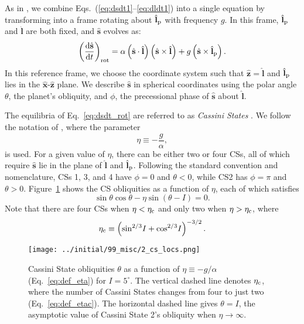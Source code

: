 \documentclass[
        fleqn,
        usenatbib,
    ]{mnras}
\newcommand*{\rd}[2]{\frac{\mathrm{d}#1}{\mathrm{d}#2}}
\newcommand*{\p}[1]{\left(#1\right)}
\newcommand*{\uv}[1]{\hat{\mathbf{#1}}}
\begin{document}
As in \citet{su2020}, we combine Eqs.~(\ref{eq:dsdt1}--\ref{eq:dldt1}) into a
single equation by transforming into a frame rotating about $\uv{l}_{\rm p}$
with frequency $g$. In this frame, $\uv{l}_{\rm p}$ and $\uv{l}$ are both fixed,
and $\uv{s}$ evolves as:
\begin{equation}
    \p{\rd{\uv{s}}{t}}_{\rm rot}
        = \alpha\p{\uv{s} \cdot \uv{l}}\p{\uv{s} \times \uv{l}}
            + g\p{\uv{s} \times \uv{l}_{\rm p}}. \label{eq:dsdt_rot}
\end{equation}
In this reference frame, we choose the coordinate system such that $\uv{z} =
\uv{l}$ and $\uv{l}_{\rm p}$ lies in the $\uv{x}$-$\uv{z}$ plane. We describe
$\uv{s}$ in spherical coordinates using the polar angle $\theta$, the planet's
obliquity, and $\phi$, the precessional phase of $\uv{s}$ about $\uv{l}$.

The equilibria of Eq.~\eqref{eq:dsdt_rot} are referred to as \emph{Cassini
States} \citep[CSs;][]{colombo1966, peale1969}. We follow the notation of
\citet{su2020}, where the parameter
\begin{equation}
    \eta \equiv -\frac{g}{\alpha},\label{eq:def_eta}
\end{equation}
is used. For a given value of $\eta$, there can be either two or four CSs, all
of which require $\uv{s}$ lie in the plane of $\uv{l}$ and $\uv{l}_{\rm p}$.
Following the standard convention and nomenclature, CSs 1, 3, and 4 have $\phi =
0$ and $\theta < 0$, while CS2 has $\phi = \pi$ and $\theta > 0$.
Figure~\ref{fig:cs_locs} shows the CS obliquities as a function of $\eta$, each
of which satisfies
\begin{equation}
    \sin \theta \cos \theta - \eta \sin\p{\theta - I} = 0.\label{eq:cs_zero}
\end{equation}
Note that there are four CSs when $\eta < \eta_{\rm c}$ and only two when $\eta
> \eta_{\rm c}$, where
\begin{equation}
    \eta_{\rm c} \equiv \p{\sin^{2/3}\!I + \cos^{2/3}\!I}^{-3/2}.\label{eq:def_etac}
\end{equation}
\begin{figure}
    \centering
    \texttt{[image: ../initial/99\_misc/2\_cs\_locs.png]}
    \caption{Cassini State obliquities $\theta$ as a function of $\eta \equiv
    -g/\alpha$ (Eq.~\ref{eq:def_eta}) for $I = 5^\circ$. The vertical dashed
    line denotes $\eta_{\rm c}$, where the number of Cassini States changes from
    four to just two (Eq.~\ref{eq:def_etac}). The horizontal dashed line gives
    $\theta = I$, the asymptotic value of Cassini State 2's obliquity when $\eta
    \to \infty$.}\label{fig:cs_locs}
\end{figure}
\end{document}
